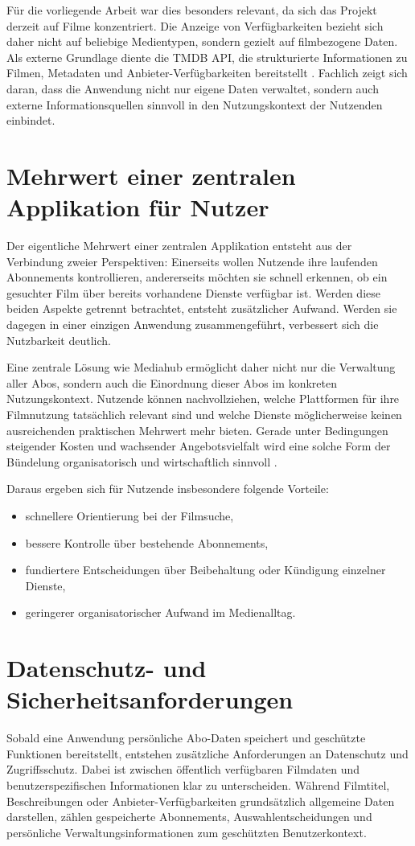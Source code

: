 Für die vorliegende Arbeit war dies besonders relevant, da sich das Projekt derzeit auf Filme konzentriert. Die Anzeige von Verfügbarkeiten bezieht sich daher nicht auf beliebige Medientypen, sondern gezielt auf filmbezogene Daten. Als externe Grundlage diente die TMDB API, die strukturierte Informationen zu Filmen, Metadaten und Anbieter-Verfügbarkeiten bereitstellt \cite{tmdb_getting_started,tmdb_watch_providers}. Fachlich zeigt sich daran, dass die Anwendung nicht nur eigene Daten verwaltet, sondern auch externe Informationsquellen sinnvoll in den Nutzungskontext der Nutzenden einbindet.

\section{Mehrwert einer zentralen Applikation für Nutzer}
Der eigentliche Mehrwert einer zentralen Applikation entsteht aus der Verbindung zweier Perspektiven: Einerseits wollen Nutzende ihre laufenden Abonnements kontrollieren, andererseits möchten sie schnell erkennen, ob ein gesuchter Film über bereits vorhandene Dienste verfügbar ist. Werden diese beiden Aspekte getrennt betrachtet, entsteht zusätzlicher Aufwand. Werden sie dagegen in einer einzigen Anwendung zusammengeführt, verbessert sich die Nutzbarkeit deutlich.

Eine zentrale Lösung wie \glqq Mediahub\grqq{} ermöglicht daher nicht nur die Verwaltung aller Abos, sondern auch die Einordnung dieser Abos im konkreten Nutzungskontext. Nutzende können nachvollziehen, welche Plattformen für ihre Filmnutzung tatsächlich relevant sind und welche Dienste möglicherweise keinen ausreichenden praktischen Mehrwert mehr bieten. Gerade unter Bedingungen steigender Kosten und wachsender Angebotsvielfalt wird eine solche Form der Bündelung organisatorisch und wirtschaftlich sinnvoll \cite{deloitte_digital_media_2025}.

Daraus ergeben sich für Nutzende insbesondere folgende Vorteile:
\begin{itemize}
    \item schnellere Orientierung bei der Filmsuche,
    \item bessere Kontrolle über bestehende Abonnements,
    \item fundiertere Entscheidungen über Beibehaltung oder Kündigung einzelner Dienste,
    \item geringerer organisatorischer Aufwand im Medienalltag.
\end{itemize}

\section{Datenschutz- und Sicherheitsanforderungen}
Sobald eine Anwendung persönliche Abo-Daten speichert und geschützte Funktionen bereitstellt, entstehen zusätzliche Anforderungen an Datenschutz und Zugriffsschutz. Dabei ist zwischen öffentlich verfügbaren Filmdaten und benutzerspezifischen Informationen klar zu unterscheiden. Während Filmtitel, Beschreibungen oder Anbieter-Verfügbarkeiten grundsätzlich allgemeine Daten darstellen, zählen gespeicherte Abonnements, Auswahlentscheidungen und persönliche Verwaltungsinformationen zum geschützten Benutzerkontext.

